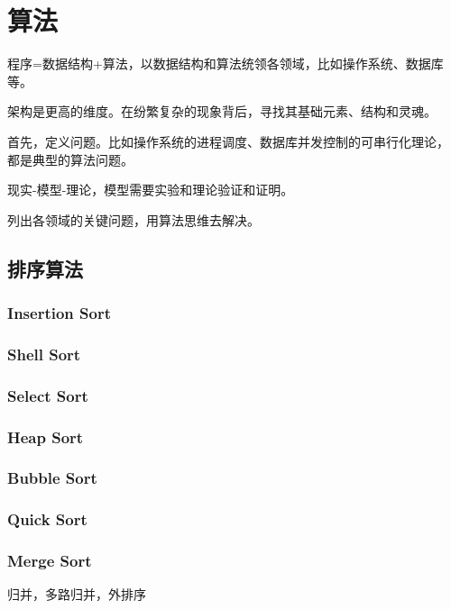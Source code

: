 \chapter{算法}

程序=数据结构+算法，以数据结构和算法统领各领域，比如操作系统、数据库等。

架构是更高的维度。在纷繁复杂的现象背后，寻找其基础元素、结构和灵魂。

首先，定义问题。比如操作系统的进程调度、数据库并发控制的可串行化理论，
都是典型的算法问题。

现实-模型-理论，模型需要实验和理论验证和证明。

列出各领域的关键问题，用算法思维去解决。

\section{排序算法}

\subsection{Insertion Sort}

\subsection{Shell Sort}

\subsection{Select Sort}

\subsection{Heap Sort}

\subsection{Bubble Sort}

\subsection{Quick Sort}

\subsection{Merge Sort}

归并，多路归并，外排序

